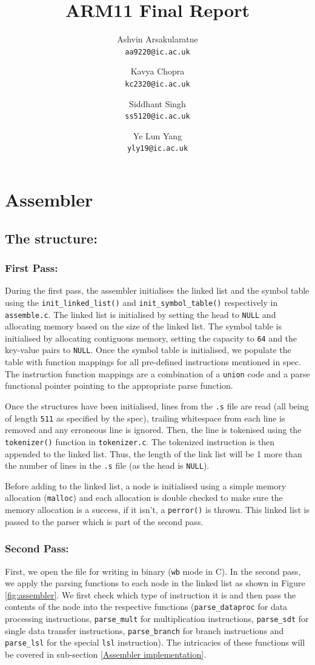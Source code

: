 \documentclass[a4paper]{article}
\title{\textbf{ARM11 Final Report}}
\author{
  Ashvin Arsakularatne\\
  \texttt{aa9220@ic.ac.uk}
  \and
  Kavya Chopra\\
  \texttt{kc2320@ic.ac.uk}
  \and
  Siddhant Singh\\
  \texttt{ss5120@ic.ac.uk}
  \and
  Ye Lun Yang\\
  \texttt{yly19@ic.ac.uk}
}
\begin{document}
\maketitle

\section{Assembler}
\subsection{The structure:}\label{The structure}
\subsubsection{First Pass: }
During the first pass, the assembler initialises the linked list and the symbol table using the \verb|init_linked_list()| and \verb|init_symbol_table()| respectively in \verb|assemble.c|. The linked list is initialised by setting the head to \verb|NULL| and allocating memory based on the size of the linked list. The symbol table is initialised by allocating contiguous memory, setting the capacity to \verb|64| and the key-value pairs to \verb|NULL|. Once the symbol table is initialised, we populate the table with function mappings for all pre-defined instructions mentioned in spec. The instruction function mappings are a combination of a \verb|union| code and a parse functional pointer pointing to the appropriate parse function. 

Once the structures have been initialised, lines from the \verb|.s| file are read (all being of length \verb|511| as specified by the spec), trailing whitespace from each line is removed and any erroneous line is ignored. Then, the line is tokenised using the \verb|tokenizer()| function in \verb|tokenizer.c|. The tokenized instruction is then appended to the linked list. Thus, the length of the link list will be 1 more than the number of lines in the \verb|.s| file (as the head is \verb|NULL|). 

Before adding to the linked list, a node is initialised using a simple memory allocation (\verb|malloc|) and each allocation is double checked to make sure the memory allocation is a success, if it isn't, a \verb|perror()| is thrown. This linked list is passed to the parser which is part of the second pass.

\subsubsection{Second Pass: }
First, we open the file for writing in binary (\verb|wb| mode in C). In the second pass, we apply the parsing functions to each node in the linked list as shown in Figure \ref{fig:assembler}. We first check which type of instruction it is and then pass the contents of the node into the respective functions (\verb|parse_dataproc| for data processing instructions, \verb|parse_mult| for multiplication instructions, \verb|parse_sdt| for single data transfer instructions, \verb|parse_branch| for branch instructions and \verb|parse_lsl| for the special \verb|lsl| instruction). The intricacies of these functions will be covered in sub-section \ref{Assembler implementation}. 
\end{document}
